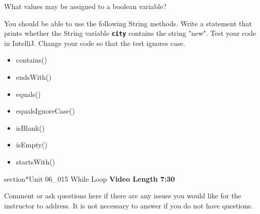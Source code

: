 \documentclass[letterpaper,12pt]{exam}
\newcommand{\unit}{Unit 06}
\begin{document}
\begin{questions}
\begin{samepage}
    \question What values may be assigned to a boolean variable?
    \vspace{5mm}
\end{samepage}

\begin{samepage}
    \question You should be able to use the following String methods.  
    \vspace{5mm}  Write a statement that prints whether the String variable \texttt{\textbf{city}} contains the string "new".  Test your code in IntelliJ.  Change your code so that the test ignores case.

\begin{itemize}
    \item contains()
    \item endsWith()
    \item equals()
    \item equalsIgnoreCase()
    \item isBlank()
    \item isEmpty()
    \item startsWith()
\end{itemize}
\end{samepage}

section*{\unit\_015 While Loop } %
\noindent \textbf{Video Length 7:30}

\begin{samepage}
	\question Comment or ask questions here if there are any issues you would like for the instructor to address.  It is not necessary to answer if you do not have questions.
	\vspace{30mm}
\end{samepage}

\end{questions}
\end{document}

